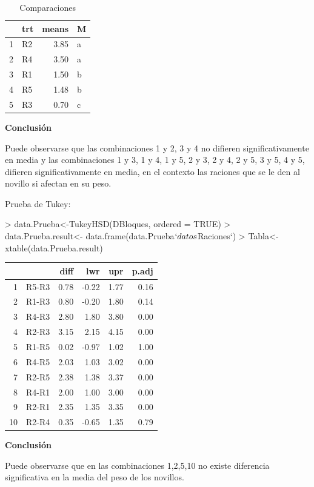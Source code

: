 \documentclass[12pt,letterpaper]{report}
\begin{document}
\begin{table}[ht]
\centering
\begin{tabular}{rlrl}
  \hline
  & trt & means & M \\ 
  \hline
  1 & R2 & 3.85 & a \\ 
  2 & R4 & 3.50 & a \\ 
  3 & R1 & 1.50 & b \\ 
  4 & R5 & 1.48 & b \\ 
  5 & R3 & 0.70 & c \\ 
   \hline
\end{tabular}
\caption{Comparaciones}
\end{table}
\newpage
\textbf{Conclusión}

Puede observarse que las combinaciones 1 y 2, 3 y 4 no difieren significativamente en media y las combinaciones 1 y 3, 1 y 4, 1 y 5, 2 y 3, 2 y 4, 2 y 5, 3 y 5, 4 y 5, difieren significativamente en media, en el contexto las raciones que se le den al novillo si afectan en su peso.  

Prueba de Tukey:
\begin{Schunk}
\begin{Sinput}
> data.Prueba<-TukeyHSD(DBloques, ordered = TRUE)
> data.Prueba.result<- data.frame(data.Prueba$`datos$Raciones`)
> Tabla<- xtable(data.Prueba.result)
\end{Sinput}
\end{Schunk}

\begin{table}[ht]
\centering
\begin{tabular}{rrrrrr}
  \hline
      & & diff & lwr & upr & p.adj \\ 
  \hline
1&R5-R3 & 0.78 & -0.22 & 1.77 & 0.16 \\ 
2&R1-R3 & 0.80 & -0.20 & 1.80 & 0.14 \\ 
3&R4-R3 & 2.80 & 1.80 & 3.80 & 0.00 \\ 
4&R2-R3 & 3.15 & 2.15 & 4.15 & 0.00 \\ 
5&R1-R5 & 0.02 & -0.97 & 1.02 & 1.00 \\ 
6&R4-R5 & 2.03 & 1.03 & 3.02 & 0.00 \\ 
7&R2-R5 & 2.38 & 1.38 & 3.37 & 0.00 \\ 
8&R4-R1 & 2.00 & 1.00 & 3.00 & 0.00 \\ 
9&R2-R1 & 2.35 & 1.35 & 3.35 & 0.00 \\ 
10&R2-R4 & 0.35 & -0.65 & 1.35 & 0.79 \\ 
   \hline
\end{tabular}
\end{table}

\textbf{Conclusión}

Puede observarse que en las combinaciones 1,2,5,10 no existe diferencia significativa en la media del peso de los novillos.
\end{document}
